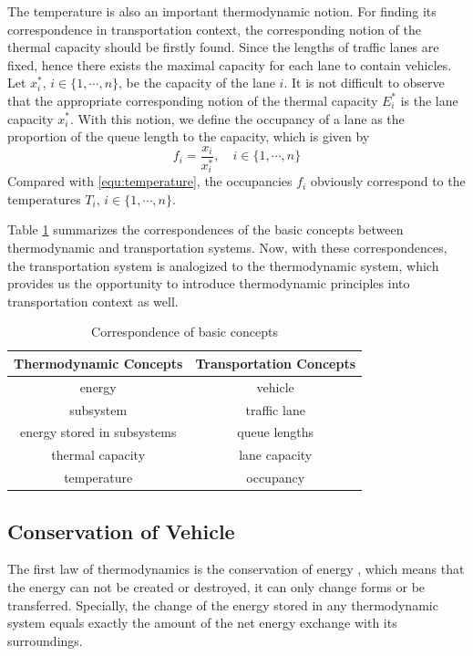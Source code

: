 \documentclass[preprint,authoryear,12pt]{elsarticle}
\begin{document}
The temperature is also an important thermodynamic notion. For
finding its correspondence in transportation context, the
corresponding notion of the thermal capacity should be firstly found.
Since the lengths of traffic lanes are fixed, hence there exists the
maximal capacity for each lane to contain vehicles. Let $x_i^*$,
$i\in\{1,\cdots,n\}$, be the capacity of the lane $i$. It is not
difficult to observe that the appropriate corresponding notion of the
thermal capacity $E_i^*$ is the lane capacity $x_i^*$. With this
notion, we define the occupancy of a lane as the proportion of the
queue length to the capacity, which is given by
\begin{equation}\label{equ:occupancy}
f_i = \frac{x_i}{x_i^*},\quad i\in\{1,\cdots,n\}
\end{equation}
Compared with \eqref{equ:temperature}, the occupancies $f_i$
obviously correspond to the temperatures $T_i$, $i\in\{1,\cdots,n\}$.

Table \ref{tab:notions} summarizes the correspondences of the basic
concepts between thermodynamic and transportation systems. Now, with
these correspondences, the transportation system is analogized to the
thermodynamic system, which provides us the opportunity to introduce
thermodynamic principles into transportation context as well.

\begin{table}[ht]
\centering \caption{Correspondence of basic concepts}
\label{tab:notions}
\begin{tabular}{cc}
  \hline
  Thermodynamic Concepts & Transportation Concepts \\
  \hline
  energy & vehicle \\
  subsystem & traffic lane \\
  energy stored in subsystems & queue lengths \\
  thermal capacity & lane capacity \\
  temperature & occupancy \\
  \hline
\end{tabular}
\end{table}

\subsection{Conservation of Vehicle}

The first law of thermodynamics is the conservation of energy
\citep{cengel_thermodynamics:_2001}, which means that the energy can
not be created or destroyed, it can only change forms or be
transferred. Specially, the change of the energy stored in any
thermodynamic system equals exactly the amount of the net energy
exchange with its surroundings.
\end{document}
